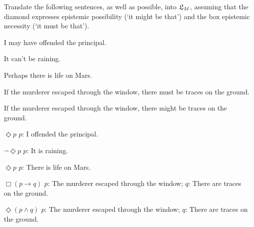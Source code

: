 \begin{exercise}
  Translate the following sentences, as well as possible, into $\mathfrak{L}_{M}$,
  assuming that the diamond expresses epistemic possibility (`it might be that')
  and the box epistemic necessity (`it must be that').
  \begin{exlist}
  \item I may have offended the principal.
  \item It can't be raining.
  \item Perhaps there is life on Mars.
  \item If the murderer escaped through the window, there must be
    traces on the ground.
  \item If the murderer escaped through the window, there might be
    traces on the ground.
  \end{exlist}
\end{exercise}
\begin{solution}
  \begin{sollist}
    \item $\Diamond p$ \quad  $p$: I offended the principal.
    \item $\neg \Diamond p$ \quad  $p$: It is raining.
    \item $\Diamond p$ \quad  $p$: There is life on Mars.
    \item $\Box(p \to q)$ \quad  $p$: The murderer escaped through the window; $q$: There are traces on the ground.
    \item $\Diamond(p \land q)$ \quad $p$: The murderer escaped through the window; $q$: There are traces on the ground.
  \end{sollist}
\end{solution}

